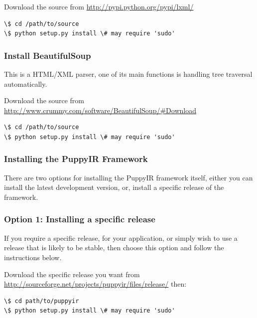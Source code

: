 \documentclass[letterpaper,10pt,english]{sphinxmanual}
\begin{document}
Download the source from \href{http://pypi.python.org/pypi/lxml/}{http://pypi.python.org/pypi/lxml/}

\begin{Verbatim}[commandchars=\\\{\}]
\$ cd /path/to/source
\$ python setup.py install \# may require 'sudo'
\end{Verbatim}


\subsubsection{Install BeautifulSoup}
\label{installation:install-beautifulsoup}
This is a HTML/XML parser, one of its main functions is handling tree traversal automatically.

Download the source from \href{http://www.crummy.com/software/BeautifulSoup/\#Download}{http://www.crummy.com/software/BeautifulSoup/\#Download}

\begin{Verbatim}[commandchars=\\\{\}]
\$ cd /path/to/source
\$ python setup.py install \# may require 'sudo'
\end{Verbatim}


\subsubsection{Installing the PuppyIR Framework}
\label{installation:install-puppy-ir}\label{installation:installing-the-puppyir-framework}
There are two options for installing the PuppyIR framework itself, either you can install the latest development version, or, install a specific release of the framework.


\subsubsection{Option 1: Installing a specific release}
\label{installation:option-1-installing-a-specific-release}
If you require a specific release, for your application, or simply wish to use a release that is likely to be stable, then choose this option and follow the instructions below.

Download the specific release you want from \href{http://sourceforge.net/projects/puppyir/files/release/}{http://sourceforge.net/projects/puppyir/files/release/} then:

\begin{Verbatim}[commandchars=\\\{\}]
\$ cd path/to/puppyir
\$ python setup.py install \# may require 'sudo'
\end{Verbatim}
\end{document}
